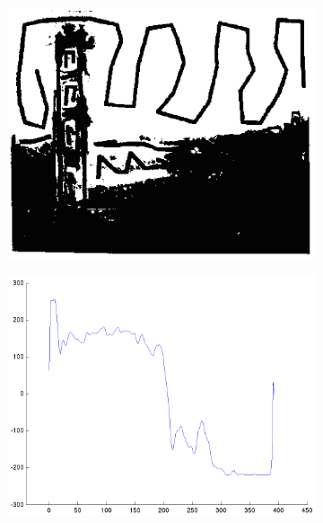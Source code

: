 \documentclass{report}
\begin{document}
\begin{figure}%
\setcounter{subfigure}{0}
\centering
\begin{subfigure}{.33\columnwidth}
\includegraphics[width=\columnwidth]{figblock.png}%
\label{figblock}
\end{subfigure}\hfill%
\begin{subfigure}{.33\columnwidth}
\includegraphics[width=\columnwidth]{fighist.png}%
\label{fighist}
\end{subfigure}
\begin{subfigure}{.33\columnwidth}

\end{subfigure}
\end{figure}
\end{document}
